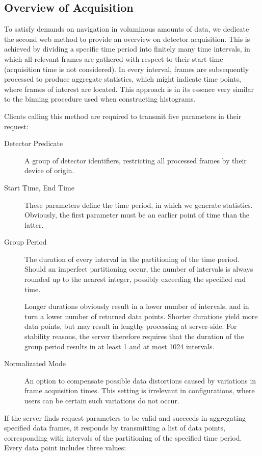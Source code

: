 \subsection{Overview of Acquisition}
To satisfy demands on navigation in voluminous amounts of data, we dedicate the second web method to provide an overview on detector acquisition. This is achieved by dividing a specific time period into finitely many time intervals, in which all relevant frames are gathered with respect to their start time (acquisition time is not considered). In every interval, frames are subsequently processed to produce aggregate statistics, which might indicate time points, where frames of interest are located. This approach is in its essence very similar to the binning procedure used when constructing histograms.

Clients calling this method are required to transmit five parameters in their request:

\begin{description}
	\item[Detector Predicate]
	A group of detector identifiers, restricting all processed frames by their device of origin.

	\item[Start Time, End Time]
	These parameters define the time period, in which we generate statistics. Obviously, the first parameter must be an earlier point of time than the latter.

	\item[Group Period]
	The duration of every interval in the partitioning of the time period. Should an imperfect partitioning occur, the number of intervals is always rounded up to the nearest integer, possibly exceeding the specified end time.

	Longer durations obviously result in a lower number of intervals, and in turn a lower number of returned data points. Shorter durations yield more data points, but may result in lengthy processing at server-side. For stability reasons, the server therefore requires that the duration of the group period results in at least 1 and at most 1024 intervals.

	\item[Normalizated Mode]
	An option to compensate possible data distortions caused by variations in frame acquisition times. This setting is irrelevant in configurations, where users can be certain such variations do not occur.
\end{description}

If the server finds request parameters to be valid and succeeds in aggregating specified data frames, it responds by transmitting a list of data points, corresponding with intervals of the partitioning of the specified time period. Every data point includes three values:

